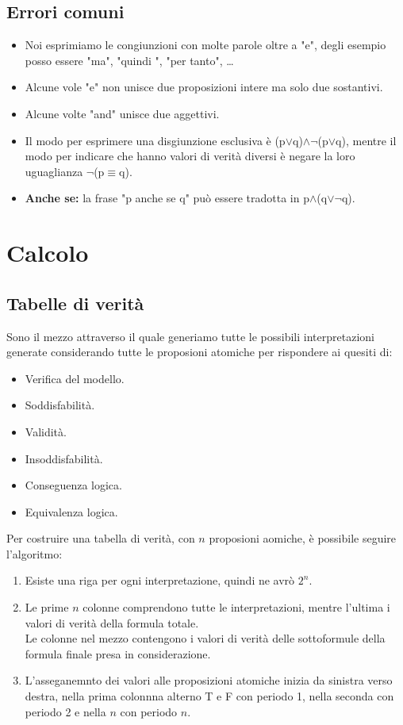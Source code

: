 \documentclass[../main.tex]{subfiles}
\begin{document}
    \section{Errori comuni}
    \begin{itemize}
        \item Noi esprimiamo le congiunzioni con molte parole oltre a "e", degli esempio posso essere "ma", "quindi ", "per tanto", \dots
        \item Alcune vole "e" non unisce due proposizioni intere ma solo due sostantivi.
        \item Alcune volte "and" unisce due aggettivi.
        \item Il modo per esprimere una disgiunzione esclusiva è (p$\lor$q)$\land \lnot$(p$\lor$q), mentre il modo per indicare che hanno valori di verità diversi è negare la loro uguaglianza $\lnot$(p$\equiv$q).
        \item \textbf{Anche se:} la frase "p anche se q" può essere tradotta in p$\land$(q$\lor \lnot$q).
    \end{itemize}

    \chapter{Calcolo}
    \section{Tabelle di verità}
    Sono il mezzo attraverso il quale generiamo tutte le possibili interpretazioni generate considerando tutte le proposioni atomiche per rispondere ai quesiti di:
    \begin{itemize}
        \item Verifica del modello.
        \item Soddisfabilità.
        \item Validità.
        \item Insoddisfabilità.
        \item Conseguenza logica.
        \item Equivalenza logica.
    \end{itemize}
    Per costruire una tabella di verità, con $n$ proposioni aomiche, è possibile seguire l'algoritmo:
    \begin{enumerate}
        \item Esiste una riga per ogni interpretazione, quindi ne avrò $2^n$.
        \item Le prime $n$ colonne comprendono tutte le interpretazioni, mentre l'ultima i valori di verità della formula totale.\\
            Le colonne nel mezzo contengono i valori di verità delle sottoformule della formula finale presa in considerazione.
        \item L'asseganemnto dei valori alle proposizioni atomiche inizia da sinistra verso destra, nella prima colonnna alterno T e F con periodo 1, nella seconda con periodo 2 e nella $n$ con periodo $n$.
    \end{enumerate}
\end{document}
